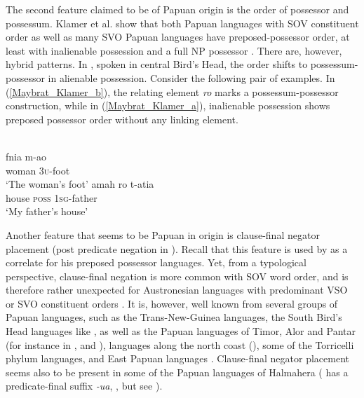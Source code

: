 The second feature claimed to be of Papuan origin is the order of possessor and possessum. Klamer et al. show that both Papuan languages with SOV constituent order as well as many SVO Papuan languages have preposed-possessor order, at least with inalienable possession and a full NP possessor \citep[123f.]{klamer2008east}. There are, however, hybrid patterns. In , spoken in central Bird's Head, the order shifts to possessum-possessor in alienable possession. Consider the following pair of examples. In (\ref{Maybrat_Klamer_b}), the relating element \textit{ro} marks a possessum-possessor construction, while in (\ref{Maybrat_Klamer_a}), inalienable possession shows preposed possessor order without any linking element.

\ea
{}\\
\ea \label{Maybrat_Klamer_a}
\gll fnia m-ao\\
woman \textsc{3}\textsc{u}-foot\\
\glt ‘The woman's foot’
\ex \label{Maybrat_Klamer_b}
\gll amah ro t-atia\\
house \textsc{poss} \textsc{1}\textsc{sg}-father\\
\glt ‘My father's house’
\z
\z

Another feature that seems to be Papuan in origin is clause-final negator placement (post predicate negation in \citealt{klamer2008east}). Recall that this feature is used by \citet{Himmelmann2005austronesian} as a correlate for his preposed possessor languages. Yet, from a typological perspective, clause-final negation is more common with SOV word order, and is therefore rather unexpected for Austronesian languages with predominant VSO or SVO constituent orders \citep{klamer2008east}. It is, however, well known from several groups of Papuan languages, such as the Trans-New-Guinea languages, the South Bird's Head languages like , as well as the Papuan languages of Timor, Alor and Pantar (for instance in ,  and ),  languages along the north coast (), some of the Torricelli phylum languages, and East Papuan languages \citep{klamer2008east}. Clause-final negator placement seems also to be present in some of the Papuan languages of Halmahera ( has a predicate-final suffix \textit{-ua}, \citealt{holton2003tobelo}, but see \citealt[131]{klamer2008east}).

